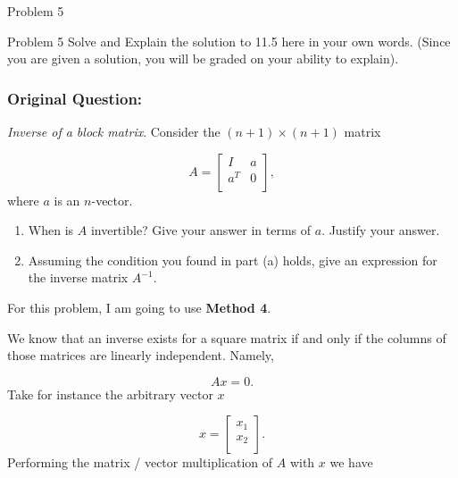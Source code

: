\begin{problem}{Problem 5}
    \begin{statement}{Problem 5}
        Solve and Explain the solution to 11.5 here in your own words. (Since you are given a solution, you will be graded on your ability to explain).

        \subsubsection*{Original Question:}

        \textit{Inverse of a block matrix}. Consider the $(n + 1) \times (n + 1)$ matrix

        \begin{equation*}
            A = 
            \begin{bmatrix}
                I & a \\
                a^{T} & 0 \\
            \end{bmatrix},
        \end{equation*}
        where $a$ is an $n$-vector.

        \begin{enumerate}[label = (\alph*)]
            \item When is $A$ invertible? Give your answer in terms of $a$. Justify your answer.
            \item Assuming the condition you found in part (a) holds, give an expression for the inverse matrix $A^{-1}$.
        \end{enumerate}
    \end{statement}

    \begin{highlight}
        \noindent For this problem, I am going to use \textbf{Method 4}. \vspace*{1em}

        We know that an inverse exists for a square matrix if and only if the columns of those matrices are linearly independent. Namely,

        \setcounter{equation}{0}
        \begin{equation}
            Ax = 0.
        \end{equation}
        Take for instance the arbitrary vector $x$

        \begin{equation}
            x = 
            \begin{bmatrix}
                x_{1} \\
                x_{2} \\
            \end{bmatrix}.
        \end{equation}
        Performing the matrix / vector multiplication of $A$ with $x$ we have


\end{highlight}
\end{problem}
